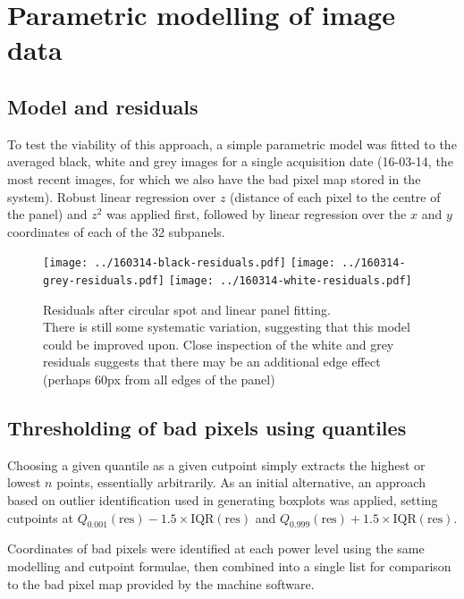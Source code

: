 \documentclass[10pt,fleqn]{article}
\begin{document}
\section*{Parametric modelling of image data}

\subsection*{Model and residuals}
To test the viability of this approach, a simple parametric model was fitted to the averaged black, white and grey images for a single acquisition date (16-03-14, the most recent images, for which we also have the bad pixel map stored in the system). Robust linear regression over  $z$ (distance of each pixel to the centre of the panel) and $z^2$ was applied first, followed by linear regression over the $x$ and $y$ coordinates of each of the 32 subpanels.

\begin{figure}[!h]
\caption{Residuals after circular spot and linear panel fitting. \\
There is still some systematic variation, suggesting that this model could be improved upon. Close inspection of the white and grey residuals suggests that there may be an additional edge effect (perhaps 60px from all edges of the panel)}
\texttt{[image: ../160314-black-residuals.pdf]} 
\texttt{[image: ../160314-grey-residuals.pdf]} 
\texttt{[image: ../160314-white-residuals.pdf]} \\
\end{figure}


\FloatBarrier
\subsection*{Thresholding of bad pixels using quantiles}
Choosing a given quantile as a given cutpoint simply extracts the highest or lowest $n$ points, essentially arbitrarily. As an initial alternative, an approach based on outlier identification used in generating boxplots was applied, setting cutpoints at $Q_{0.001}(\text{res}) - 1.5 \times \text{IQR}(\text{res})$ and $Q_{0.999}(\text{res}) + 1.5 \times \text{IQR}(\text{res})$.

Coordinates of bad pixels were identified at each power level using the same modelling and cutpoint formulae, then combined into a single list for comparison to the bad pixel map provided by the machine software.
\end{document}
